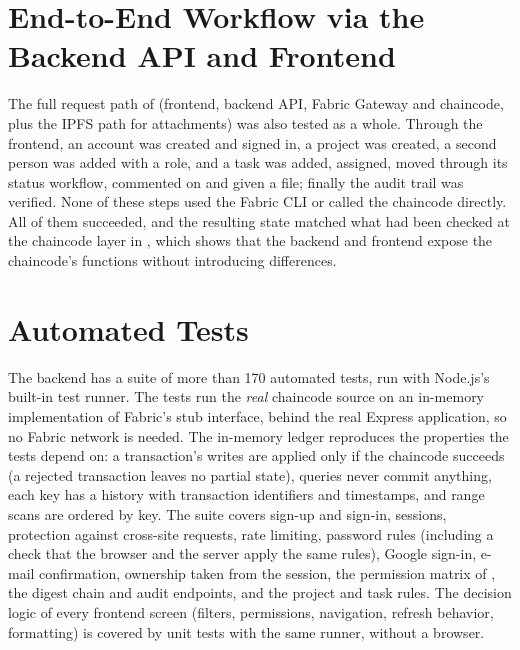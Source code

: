 \section{End-to-End Workflow via the Backend API and Frontend}
\label{sec:results-e2e}

The full request path of  (frontend, backend API, Fabric Gateway and chaincode, plus the IPFS path for attachments) was also tested as a whole. Through the frontend, an account was created and signed in, a project was created, a second person was added with a role, and a task was added, assigned, moved through its status workflow, commented on and given a file; finally the audit trail was verified. None of these steps used the Fabric CLI or called the chaincode directly. All of them succeeded, and the resulting state matched what had been checked at the chaincode layer in , which shows that the backend and frontend expose the chaincode's functions without introducing differences.

\section{Automated Tests}
\label{sec:results-tests}

The backend has a suite of more than 170 automated tests, run with Node.js's built-in test runner. The tests run the \emph{real} chaincode source on an in-memory implementation of Fabric's stub interface, behind the real Express application, so no Fabric network is needed. The in-memory ledger reproduces the properties the tests depend on: a transaction's writes are applied only if the chaincode succeeds (a rejected transaction leaves no partial state), queries never commit anything, each key has a history with transaction identifiers and timestamps, and range scans are ordered by key. The suite covers sign-up and sign-in, sessions, protection against cross-site requests, rate limiting, password rules (including a check that the browser and the server apply the same rules), Google sign-in, e-mail confirmation, ownership taken from the session, the permission matrix of , the digest chain and audit endpoints, and the project and task rules. The decision logic of every frontend screen (filters, permissions, navigation, refresh behavior, formatting) is covered by unit tests with the same runner, without a browser.

